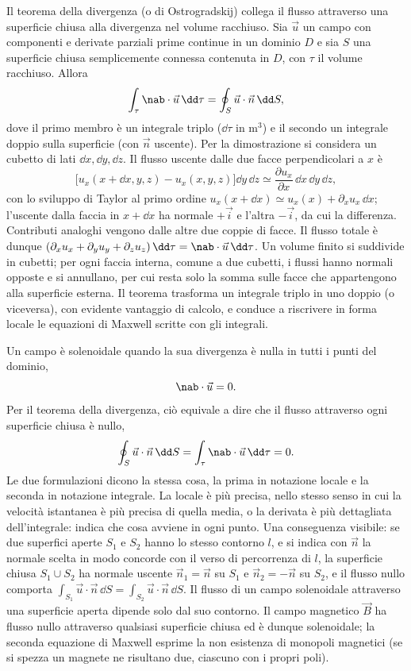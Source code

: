 \documentclass[main.tex]{subfiles}
\begin{document}
Il teorema della divergenza (o di Ostrogradskij) collega il flusso attraverso una superficie chiusa alla divergenza nel volume racchiuso. Sia $\vec u$ un campo con componenti e derivate parziali prime continue in un dominio $D$ e sia $S$ una superficie chiusa semplicemente connessa contenuta in $D$, con $\tau$ il volume racchiuso. Allora
\[
\int_\tau\nab\cdot\vec u\,\dd\tau=\oint_S\vec u\cdot\vec n\,\dd S ,
\]
dove il primo membro è un integrale triplo ($\dd\tau$ in $\mathrm{m^3}$) e il secondo un integrale doppio sulla superficie (con $\vec n$ uscente). Per la dimostrazione si considera un cubetto di lati $\dd x,\dd y,\dd z$. Il flusso uscente dalle due facce perpendicolari a $x$ è
\[
\bigl[u_x(x+\dd x,y,z)-u_x(x,y,z)\bigr]\dd y\,\dd z\simeq\frac{\partial u_x}{\partial x}\,\dd x\,\dd y\,\dd z ,
\]
con lo sviluppo di Taylor al primo ordine $u_x(x+\dd x)\simeq u_x(x)+\partial_xu_x\,\dd x$; l'uscente dalla faccia in $x+\dd x$ ha normale $+\vec i$ e l'altra $-\vec i$, da cui la differenza. Contributi analoghi vengono dalle altre due coppie di facce. Il flusso totale è dunque $\left(\partial_xu_x+\partial_yu_y+\partial_zu_z\right)\dd\tau=\nab\cdot\vec u\,\dd\tau$. Un volume finito si suddivide in cubetti; per ogni faccia interna, comune a due cubetti, i flussi hanno normali opposte e si annullano, per cui resta solo la somma sulle facce che appartengono alla superficie esterna. Il teorema trasforma un integrale triplo in uno doppio (o viceversa), con evidente vantaggio di calcolo, e conduce a riscrivere in forma locale le equazioni di Maxwell scritte con gli integrali.



Un campo è solenoidale quando la sua divergenza è nulla in tutti i punti del dominio,
\[
\nab\cdot\vec u=0 .
\]
Per il teorema della divergenza, ciò equivale a dire che il flusso attraverso ogni superficie chiusa è nullo,
\[
\oint_S\vec u\cdot\vec n\,\dd S=\int_\tau\nab\cdot\vec u\,\dd\tau=0 .
\]
Le due formulazioni dicono la stessa cosa, la prima in notazione locale e la seconda in notazione integrale. La locale è più precisa, nello stesso senso in cui la velocità istantanea è più precisa di quella media, o la derivata è più dettagliata dell'integrale: indica che cosa avviene in ogni punto. Una conseguenza visibile: se due superfici aperte $S_1$ e $S_2$ hanno lo stesso contorno $l$, e si indica con $\vec n$ la normale scelta in modo concorde con il verso di percorrenza di $l$, la superficie chiusa $S_1\cup S_2$ ha normale uscente $\vec n_1=\vec n$ su $S_1$ e $\vec n_2=-\vec n$ su $S_2$, e il flusso nullo comporta $\int_{S_1}\vec u\cdot\vec n\,\dd S=\int_{S_2}\vec u\cdot\vec n\,\dd S$. Il flusso di un campo solenoidale attraverso una superficie aperta dipende solo dal suo contorno. Il campo magnetico $\vec B$ ha flusso nullo attraverso qualsiasi superficie chiusa ed è dunque solenoidale; la seconda equazione di Maxwell esprime la non esistenza di monopoli magnetici (se si spezza un magnete ne risultano due, ciascuno con i propri poli).
\end{document}
